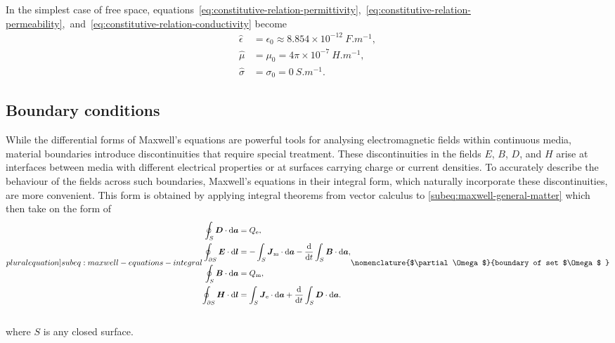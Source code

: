 \documentclass[11pt,a4paper,twoside,openany]{report}
\begin{document}
\begin{example}
    In the simplest case of free space, equations~\eqref{eq:constitutive-relation-permittivity},~\eqref{eq:constitutive-relation-permeability},~and~\eqref{eq:constitutive-relation-conductivity} become
    \begin{subequations}
        \begin{align}
            \hat\epsilon &= \epsilon_0 \approx 8.854\times 10^{-12}\ \unit{F.m^{-1}},
        \\
            \hat\mu &= \mu_0 = 4\pi\times 10^{-7}\ \unit{H.m^{-1}},
        \\
            \hat\sigma &= \sigma_0 = 0\ \unit{S.m^{-1}}.
        \end{align}
    \end{subequations}
\end{example}

\subsection{Boundary conditions}
While the differential forms of Maxwell's equations are powerful tools for analysing electromagnetic fields within continuous media, material boundaries introduce discontinuities that require special treatment. These discontinuities in the fields $E$, $B$, $D$, and $H$ arise at interfaces between media with different electrical properties or at surfaces carrying charge or current densities. To accurately describe the behaviour of the fields across such boundaries, Maxwell's equations in their integral form, which naturally incorporate these discontinuities, are more convenient. This form is obtained by applying integral theorems from vector calculus to \cref{subeq:maxwell-general-matter} which then take on the form of\\
\begin{subequations}
    \index{boundary conditions}
    \label[pluralequation]{subeq:maxwell-equations-integral}
    \noindent\centering
    \begin{align}
        \label{eq:maxwell-equations-integral-div-d}
        \oint_S \vec D \cdot \d\vec a &= Q_{\mathrm{e}},
    \\
        \label{eq:maxwell-equations-integral-curl-e}
        \oint_{\partial S} \vec E \cdot \d\vec l &= -\int_S \vec J_{\mathrm m} \cdot \d\vec a - \frac{\d}{\d t}\int_S \vec B \cdot \d\vec a,
    \\
        \label{eq:maxwell-equations-integral-div-b}
        \oint_S \vec B \cdot \d\vec a &= Q_{\mathrm{m}},
    \\
        \label{eq:maxwell-equations-integral-curl-h}
        \oint_{\partial S} \vec H \cdot \d\vec l &= \int_S \vec J_{\mathrm e} \cdot \d\vec a + \frac{\d}{\d t}\int_S \vec D \cdot \d\vec a.
    \end{align}
    \nomenclature{$\partial\Omega$}{boundary of set $\Omega$ }%
\end{subequations}\\
where $S$ is any closed surface.
\end{document}
